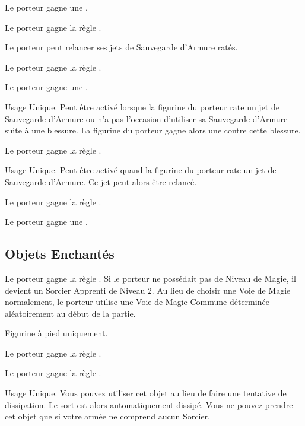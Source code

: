 Le porteur gagne une .

Le porteur gagne la règle .

Le porteur peut relancer ses jets de Sauvegarde d'Armure ratés.

Le porteur gagne la règle .

Le porteur gagne une .

Usage Unique. Peut être activé lorsque la figurine du porteur rate un jet de Sauvegarde d'Armure ou n'a pas l'occasion d'utiliser sa Sauvegarde d'Armure suite à une blessure. La figurine du porteur gagne alors une  contre cette blessure.

Le porteur gagne la règle .

Usage Unique. Peut être activé quand la figurine du porteur rate un jet de Sauvegarde d'Armure. Ce jet peut alors être relancé.

Le porteur gagne la règle \fireborn{}.

Le porteur gagne une .

\endpricelist

\newpage
\hypertarget{enchanteditems}{\subsection{Objets Enchantés}}
\label{enchanted_items}

\startpricelist

Le porteur gagne la règle \stupidity{}. Si le porteur ne possédait pas de Niveau de Magie, il devient un Sorcier Apprenti de Niveau 2. Au lieu de choisir une Voie de Magie normalement, le porteur utilise une Voie de Magie Commune déterminée aléatoirement au début de la partie.

Figurine à pied uniquement.

Le porteur gagne la règle .

Le porteur gagne la règle \lightningreflexes{}.

Usage Unique. Vous pouvez utiliser cet objet au lieu de faire une tentative de dissipation. Le sort est alors automatiquement dissipé. Vous ne pouvez prendre cet objet que si votre armée ne comprend aucun Sorcier.

